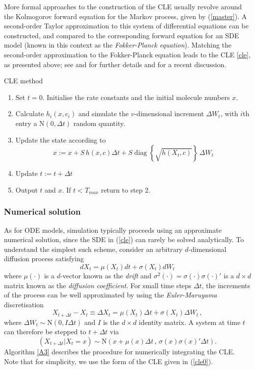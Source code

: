 \documentclass[12pt, DIV12]{scrartcl}
\begin{document}
More formal approaches to the construction of the CLE usually revolve around the
Kolmogorov forward equation for the Markov process, given by (\ref{master}). A
second-order Taylor approximation to this system of differential equations can
be constructed, and compared to the corresponding forward equation for an SDE
model (known in this context as the \emph{Fokker-Planck equation}). Matching the
second-order approximation to the Fokker-Planck equation leads to the CLE
\eqref{cle}, as presented above; see \cite{Gillespie92b} and \cite{Gillespie00}
for further details and \cite{golightly11} for a recent discussion.
\begin{algorithm}[t]
\caption{CLE method}\label{A3}
\begin{enumerate}
\item Set $t=0$. Initialise the rate constants and the initial molecule numbers $x$.
\item Calculate $h_i(x,c_i)$ and simulate the $v$-dimensional increment $\Delta
  W_t$, with $i$th entry a $\textrm{N}(0,\Delta t)$ random quantity.
\item Update the state according to 
\[
x := x+S\,h(x,c)\Delta t +S\operatorname{diag}\left\{\sqrt{h(X_t,c)}\right\}\,\Delta W_t
\]
\item Update $t:=t+\Delta t$
\item Output $t$ and $x$. If $t<T_{max}$ return to step 2.
\end{enumerate}
\end{algorithm}

\subsubsection{Numerical solution}

As for ODE models, simulation typically proceeds using an approximate numerical
solution, since the SDE in (\ref{cle}) can rarely be solved analytically. To
understand the simplest such scheme, consider an arbitrary $d$-dimensional
diffusion process satisfying
\[
{d}X_t = \mu(X_t){d}t + \sigma(X_{t}){d}W_t
\]
where $\mu(\cdot)$ is a $d$-vector known as the \emph{drift} and
$\sigma^{2}(\cdot)=\sigma(\cdot)\sigma(\cdot)'$ is a $d\times d$ matrix known as
the \emph{diffusion coefficient}. For small time steps $\Delta t$, the
increments of the process can be well approximated by using the
\emph{Euler-Maruyama} discretisation
\[
X_{t+\Delta t}-X_{t} \equiv \Delta X_{t} = \mu(X_t)\Delta t + \sigma(X_{t})\Delta W_t\,,
\]
where $\Delta W_t\sim \textrm{N}(0,I\Delta t)$ and $I$ is the $d\times d$ identity matrix. 
A system at time $t$ can therefore be stepped to $t+\Delta t$ via
\[
\left(X_{t+\Delta t}|X_{t}=x\right)\sim \textrm{N}\left(x+\mu(x)\Delta t\,,\,\sigma(x)\sigma(x)'\Delta t\right).
\] 
Algorithm \ref{A3} describes the procedure for numerically integrating the 
CLE. Note that for simplicity, we use the form of the CLE given in (\ref{cle0}).
\end{document}
